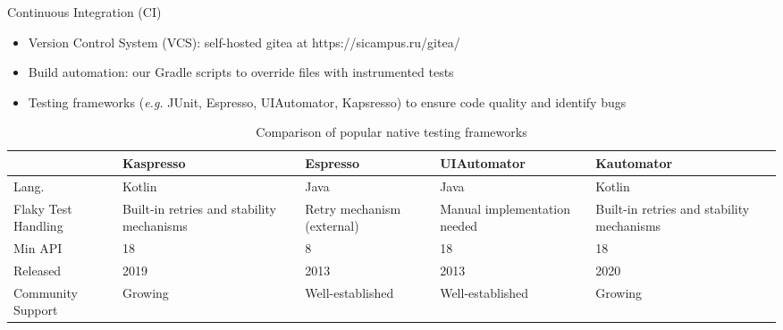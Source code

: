 \documentclass{beamer}%
\begin{document}
\begin{frame}{Continuous Integration (CI)}
\begin{changemargin}
\footnotesize


\begin{itemize}
\item Version Control System (VCS): self-hosted gitea at https://sicampus.ru/gitea/
\item Build automation: our Gradle scripts to override files with instrumented tests
\item Testing frameworks (\textit{e.g.} JUnit, Espresso, UIAutomator, Kapsresso) to ensure code quality and identify bugs
\end{itemize}



\begin{table}
\caption{Comparison of popular native testing frameworks}
\centering\begin{tabulary}{1.1\textwidth}{LLLLL}
\toprule
& \textbf{Kaspresso}            & \textbf{Espresso}                             & \textbf{UIAutomator}                              & \textbf{Kautomator} \\
\midrule

Lang.                                & Kotlin                                                 & Java                                 & Java                                     & Kotlin                                     \\
Flaky Test Handling                     & Built-in retries and stability mechanisms              & Retry mechanism (external)           & Manual implementation needed             & Built-in retries and stability mechanisms  \\
Min API                           & 18                                                     & 8                                    & 18                                       & 18                                         \\
Released                           & 2019                                                   & 2013                                 & 2013                                     & 2020                                       \\
Community Support                       & Growing                                                & Well-established                     & Well-established                         & Growing                                    \\

\end{tabulary}
\label{table:espress_kaspresso_comparison}
\end{table}




\end{changemargin}
\end{frame}
\end{document}
